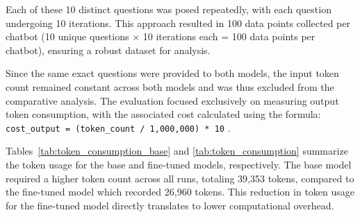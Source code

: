 \documentclass[12pt,oneside,openany]{report}
\begin{document}
Each of these 10 distinct questions was posed repeatedly, with each question undergoing 10 iterations. This approach resulted in 100 data points collected per chatbot (10 unique questions × 10 iterations each = 100 data points per chatbot), ensuring a robust dataset for analysis.

Since the same exact questions were provided to both models, the input token count remained constant across both models and was thus excluded from the comparative analysis. The evaluation focused exclusively on measuring output token consumption, with the associated cost calculated using the formula: \verb|cost_output = (token_count / 1,000,000) * 10| \cite{openai2023}.

Tables~\ref{tab:token_consumption_base} and \ref{tab:token_consumption} summarize the token usage for the base and fine-tuned models, respectively. The base model required a higher token count across all runs, totaling 39,353 tokens, compared to the fine-tuned model which recorded 26,960 tokens. This reduction in token usage for the fine-tuned model directly translates to lower computational overhead.


\begin{table}[ht]
\centering
\caption{Token Consumption Base Model}
\label{tab:token_consumption_base}
\end{table}
\end{document}
